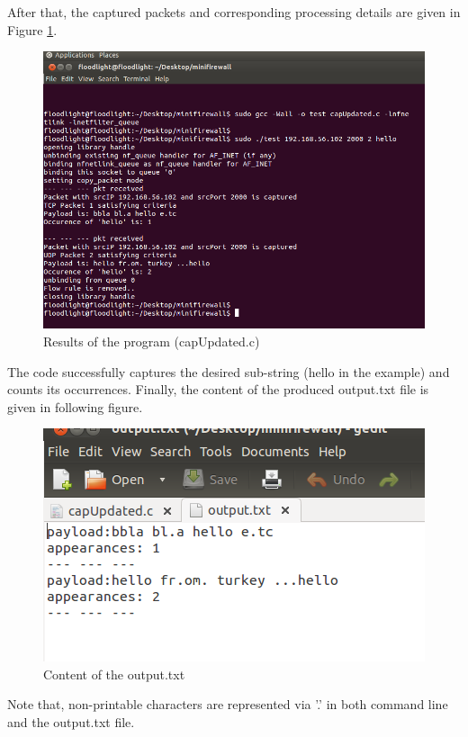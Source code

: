 \documentclass[paper=a4, fontsize=11pt]{scrartcl}
\numberwithin{equation}{section}		%
\numberwithin{figure}{section}			%
\numberwithin{table}{section}				%
\begin{document}
After that, the captured packets and corresponding processing details are given in Figure \ref{res}.
\begin{figure}[H]
\centering
\includegraphics[width=\textwidth]{img2/ures.png}
\caption{Results of the program (capUpdated.c)}\label{res}
\end{figure}

The code successfully captures the desired sub-string (hello in the example) and counts its occurrences. Finally, the content of the produced output.txt file is given in following figure.

\begin{figure}[H]
\centering
\includegraphics[width=\textwidth]{img2/uout.png}
\caption{Content of the output.txt}
\end{figure}

Note that, non-printable characters are represented via '.' in both command line and the output.txt file.
\end{document}
